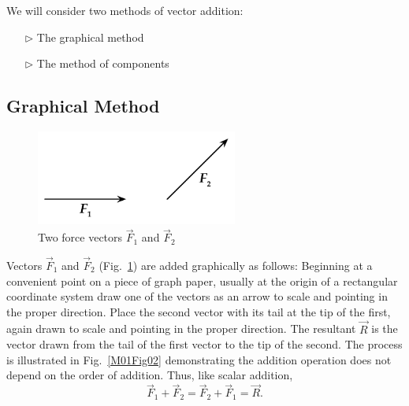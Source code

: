 We will consider two methods of vector addition:
\begin{enumerate}
\item[$\triangleright$] The graphical method
\item[$\triangleright$] The method of components
\end{enumerate}

\subsection{Graphical Method}

\begin{figure}%
  \begin{center}        
    \includegraphics[width=2.6in]{Experiment01Figures/Figure01.pdf}
  \end{center}
  \caption{Two force vectors $\vec{F}_1$ and $\vec{F}_2$}
  \label{M01Fig01}  %
\end{figure}

Vectors $\vec{F}_1$ and $\vec{F}_2$  (Fig.~\ref{M01Fig01}) are added graphically as follows:
Beginning at a convenient point on a piece of graph paper, usually at the origin of a rectangular coordinate system draw one of the vectors as an arrow to scale and pointing in the proper direction.  Place the second vector with its tail at the tip of the first, again drawn to scale and pointing in the proper direction.  The resultant $\vec{R}$ is the vector drawn from the tail of the first vector to the tip of the second.  The process is illustrated in Fig.~\ref{M01Fig02} demonstrating the addition operation does not depend on the order of addition.  Thus, like scalar addition,
\begin{equation}
  \vec{F}_1 + \vec{F}_2 = \vec{F}_2 + \vec{F}_1 = \vec{R}.
\end{equation}

